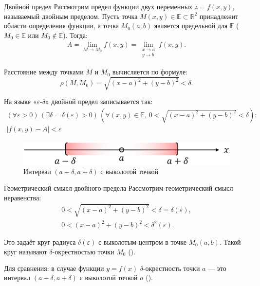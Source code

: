 \begin{tbox}{Двойной предел}
	Рассмотрим предел функции двух переменных \( z = f(x, y) \), называемый двойным пределом. Пусть точка \( M(x, y) \in \mathbb{E} \subset \mathbb{R}^2 \) принадлежит области определения функции, а точка \( M_0(a, b) \) является предельной для \( \mathbb{E} \) (\( M_0 \in \mathbb{E} \) или \( M_0 \notin \mathbb{E} \)). Тогда:
	\begin{align}
		A = \lim_{M \to M_0} f(x, y) =
		\lim_{\substack{x \to a \\ y \to b}} f(x, y).
	\end{align}

	Расстояние между точками \( M \) и \( M_0 \) вычисляется по формуле:
	\[
	\rho(M, M_0) = \sqrt{(x - a)^2 + (y - b)^2} < \delta.
	\]

	На языке «\(\varepsilon\)-\(\delta\)» двойной предел записывается так:
	\begin{align}
		(\forall \varepsilon > 0) \, (\exists \delta = \delta(\varepsilon) > 0) \,
		(\forall (x, y) \in \mathbb{E}, \, 0 < \sqrt{(x - a)^2 + (y - b)^2} < \delta) : \\
		|f(x, y) - A| < \varepsilon
		\label{eq:3}
	\end{align}
\end{tbox}
\begin{figure}[t]
	\centering
	\includegraphics[width=0.7\linewidth]{image/screenshot008}
	\caption{Интервал $(a - \delta, a + \delta)$ с выколотой точкой}
	\label{fig:1.3.1}
\end{figure}
\begin{tbox}{Геометрический смысл двойного предела}
	Рассмотрим геометрический смысл неравенства:
	\begin{gather}
		0 < \sqrt{(x - a)^2 + (y - b)^2} < \delta = \delta(\varepsilon), \\
		0 < (x - a)^2 + (y - b)^2 < \delta^2(\varepsilon).
	\end{gather}

	Это задаёт круг радиуса \( \delta(\varepsilon) \) с выколотым центром в точке \( M_0(a, b) \). Такой круг называют \(\delta\)-окрестностью точки \( M_0 \) ().

	Для сравнения: в случае функции \( y = f(x) \) \(\delta\)-окрестность точки \( a \) — это интервал \( (a - \delta, a + \delta) \) с выколотой точкой \( a \) ().
\end{tbox}

